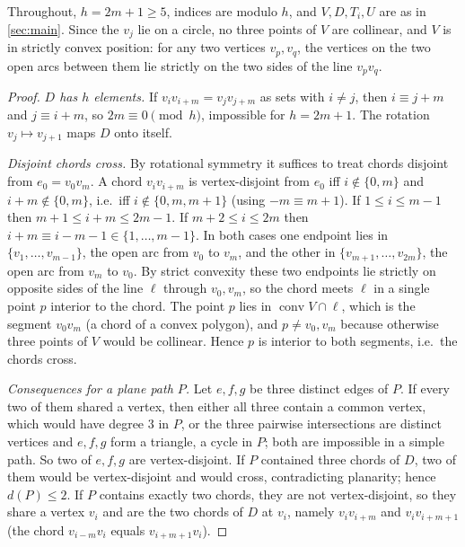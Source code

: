 \documentclass[11pt,a4paper]{article}
\theoremstyle{plain}
\theoremstyle{definition}
\theoremstyle{remark}
\newcommand{\conv}{\operatorname{conv}}
\newcommand{\dP}{d}
\begin{document}
Throughout, $h=2m+1\ge5$, indices are modulo $h$, and $V,D,T_i,U$ are as in \cref{sec:main}. Since the $v_j$ lie on a circle, no three points of $V$ are collinear, and $V$ is in strictly convex position: for any two vertices $v_p,v_q$, the vertices on the two open arcs between them lie strictly on the two sides of the line $v_pv_q$.

\label{pf:chords}
\lemchords*
\begin{proof}
\emph{$D$ has $h$ elements.} If $v_iv_{i+m}=v_jv_{j+m}$ as sets with $i\ne j$, then $i\equiv j+m$ and $j\equiv i+m$, so $2m\equiv0\pmod h$, impossible for $h=2m+1$. The rotation $v_j\mapsto v_{j+1}$ maps $D$ onto itself.

\emph{Disjoint chords cross.} By rotational symmetry it suffices to treat chords disjoint from $e_0=v_0v_m$. A chord $v_iv_{i+m}$ is vertex-disjoint from $e_0$ iff $i\notin\{0,m\}$ and $i+m\notin\{0,m\}$, i.e.\ iff $i\notin\{0,m,m+1\}$ (using $-m\equiv m+1$). If $1\le i\le m-1$ then $m+1\le i+m\le 2m-1$. If $m+2\le i\le 2m$ then $i+m\equiv i-m-1\in\{1,\dots,m-1\}$. In both cases one endpoint lies in $\{v_1,\dots,v_{m-1}\}$, the open arc from $v_0$ to $v_m$, and the other in $\{v_{m+1},\dots,v_{2m}\}$, the open arc from $v_m$ to $v_0$. By strict convexity these two endpoints lie strictly on opposite sides of the line $\ell$ through $v_0,v_m$, so the chord meets $\ell$ in a single point $p$ interior to the chord. The point $p$ lies in $\conv V\cap\ell$, which is the segment $v_0v_m$ (a chord of a convex polygon), and $p\ne v_0,v_m$ because otherwise three points of $V$ would be collinear. Hence $p$ is interior to both segments, i.e.\ the chords cross.

\emph{Consequences for a plane path $P$.} Let $e,f,g$ be three distinct edges of $P$. If every two of them shared a vertex, then either all three contain a common vertex, which would have degree $3$ in $P$, or the three pairwise intersections are distinct vertices and $e,f,g$ form a triangle, a cycle in $P$; both are impossible in a simple path. So two of $e,f,g$ are vertex-disjoint. If $P$ contained three chords of $D$, two of them would be vertex-disjoint and would cross, contradicting planarity; hence $\dP(P)\le2$. If $P$ contains exactly two chords, they are not vertex-disjoint, so they share a vertex $v_i$ and are the two chords of $D$ at $v_i$, namely $v_iv_{i+m}$ and $v_iv_{i+m+1}$ (the chord $v_{i-m}v_i$ equals $v_{i+m+1}v_i$).
\end{proof}
\end{document}
